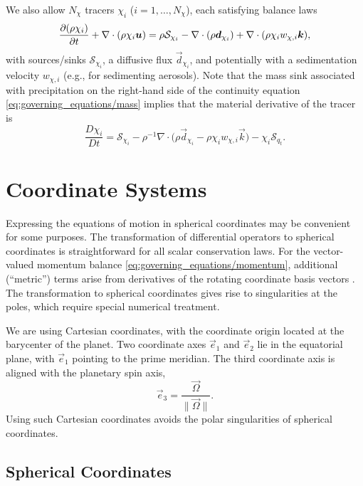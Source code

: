 \documentclass{report}
\begin{document}
We also allow $N_\chi$ tracers $\chi_i$ ($i=1, \dots, N_\chi$), each satisfying balance laws
\begin{equation}
\frac{\partial (\rho \chi_i)}{\partial t} + \nabla \cdot \left(\rho \chi_i \boldsymbol{{u}} \right) = \rho \mathcal{S}_{\chi_i} - \nabla \cdot (\rho \boldsymbol{{d}}_{\chi_i}) + \nabla \cdot (\rho \chi_{i} w_{\chi, i} \boldsymbol{{k}}),   
\label{eq:tracers}
\end{equation}
with sources/sinks $\mathcal{S}_{\chi_i}$, a diffusive flux $\vec{d}_{\chi_i}$, and potentially with a sedimentation velocity $w_{\chi, i}$ (e.g., for sedimenting aerosols). Note that the mass sink associated with precipitation on the right-hand side of the continuity equation \eqref{eq:governing_equations/mass} implies that the material derivative of the tracer is 
\[
\frac{D\chi_i}{Dt} = \mathcal{S}_{\chi_i} - \rho^{-1} \nabla \cdot \bigl(\rho \vec{d}_{\chi_i} - \rho \chi_{i} w_{\chi, i} \vec{k}\bigr)- \chi_i \mathcal{S}_{q_t}.
\]
 
\section{Coordinate Systems}

Expressing the equations of motion in spherical coordinates may be convenient for some purposes. The transformation of differential operators to spherical coordinates is straightforward for all scalar conservation laws. For the vector-valued momentum balance \eqref{eq:governing_equations/momentum}, additional (``metric'') terms arise from derivatives of the rotating coordinate basis vectors \citep[e.g.,][]{Staniforth03a}. The transformation to spherical coordinates gives rise to singularities at the poles, which require special numerical treatment. 

We are using Cartesian coordinates, with the coordinate origin located at the barycenter of the planet. Two coordinate axes $\vec{e}_1$ and $\vec{e}_2$ lie in the equatorial plane, with $\vec{e}_1$ pointing to the prime meridian. The third coordinate axis is aligned with the planetary spin axis,
\[
\vec{e}_3 = \frac{\vec{\Omega}}{\|\vec{\Omega}\|}.
\]
Using such Cartesian coordinates avoids the polar singularities of spherical coordinates. 

\subsection{Spherical Coordinates}
\end{document}

